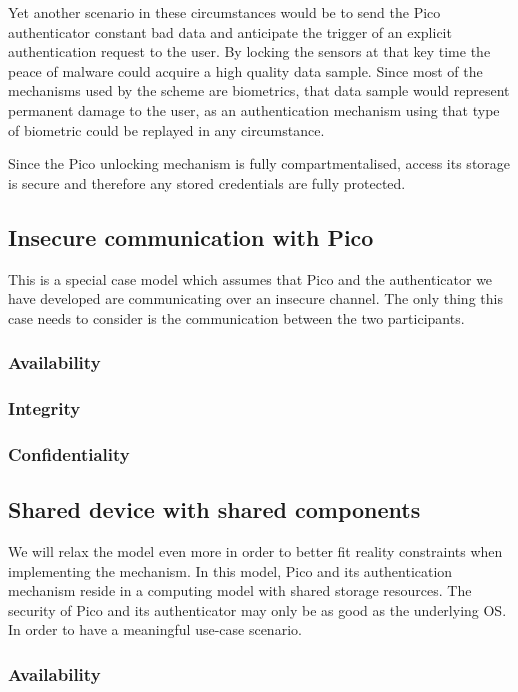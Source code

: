 	Yet another scenario in these circumstances would be to send the Pico authenticator constant bad data and anticipate the trigger of an explicit authentication request to the user. By locking the sensors at that key time the peace of malware could acquire a high quality data sample. Since most of the mechanisms used by the scheme are biometrics, that data sample would represent permanent damage to the user, as an authentication mechanism using that type of biometric could be replayed in any circumstance. 
	
	Since the Pico unlocking mechanism is fully compartmentalised, access its storage is secure and therefore any stored credentials are fully protected.

\subsection{Insecure communication with Pico}
This is a special case model which assumes that Pico and the authenticator we have developed are communicating over an insecure channel. The only thing this case needs to consider is the communication between the two participants.

	\subsubsection*{Availability}
	\subsubsection*{Integrity}
	\subsubsection*{Confidentiality}

	
\subsection{Shared device with shared components}
We will relax the model even more in order to better fit reality constraints when implementing the mechanism. In this model, Pico and its authentication mechanism reside in a computing model with shared storage resources. The security of Pico and its authenticator may only be as good as the underlying OS. In order to have a meaningful use-case scenario.

	\subsubsection*{Availability}

